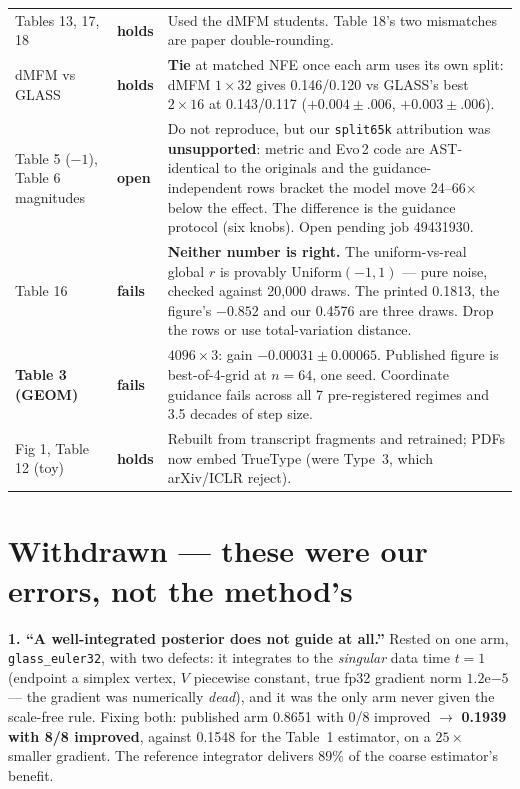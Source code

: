 \documentclass[10pt]{article}
\newcommand{\Y}{\textcolor{ok}{\textbf{holds}}}
\newcommand{\N}{\textcolor{bad}{\textbf{fails}}}
\newcommand{\W}{\textcolor{warn}{\textbf{open}}}
\begin{document}
\begin{longtable}{@{}p{3.4cm}p{1.6cm}p{10.2cm}@{}}
Tables 13, 17, 18 & \Y & Used the dMFM students. Table 18's two mismatches are paper
  double-rounding. \\
dMFM vs GLASS & \Y & \textbf{Tie} at matched NFE once each arm uses its own split:
  dMFM $1{\times}32$ gives 0.146/0.120 vs GLASS's best $2{\times}16$ at 0.143/0.117
  ($+0.004\pm.006$, $+0.003\pm.006$). \\
Table 5 ($-1$), Table 6 magnitudes & \W & Do not reproduce, but our \texttt{split65k} attribution
  was \textbf{unsupported}: metric and Evo\,2 code are AST-identical to the originals and the
  guidance-independent rows bracket the model move 24--66$\times$ below the effect. The difference
  is the guidance protocol (six knobs). Open pending job 49431930. \\
Table 16 & \N & \textbf{Neither number is right.} The uniform-vs-real global $r$ is provably
  $\mathrm{Uniform}(-1,1)$ --- pure noise, checked against 20{,}000 draws. The printed 0.1813, the
  figure's $-0.852$ and our 0.4576 are three draws. Drop the rows or use total-variation distance. \\
\textbf{Table 3 (GEOM)} & \N & $4096{\times}3$: gain $-0.00031\pm0.00065$. Published figure is
  best-of-4-grid at $n{=}64$, one seed. Coordinate guidance fails across all 7 pre-registered
  regimes and 3.5 decades of step size. \\
Fig 1, Table 12 (toy) & \Y & Rebuilt from transcript fragments and retrained; PDFs now embed
  TrueType (were Type~3, which arXiv/ICLR reject). \\
\bottomrule
\end{longtable}

\section{Withdrawn --- these were our errors, not the method's}

\textbf{1. ``A well-integrated posterior does not guide at all.''} Rested on one arm,
\texttt{glass\_euler32}, with two defects: it integrates to the \emph{singular} data time $t{=}1$
(endpoint a simplex vertex, $V$ piecewise constant, true fp32 gradient norm $1.2\mathrm{e}{-5}$ ---
the gradient was numerically \emph{dead}), and it was the only arm never given the scale-free rule.
Fixing both: published arm 0.8651 with 0/8 improved $\to$ \textbf{0.1939 with 8/8 improved}, against
0.1548 for the Table~1 estimator, on a $25\times$ smaller gradient. The reference integrator
delivers 89\% of the coarse estimator's benefit.
\end{document}
